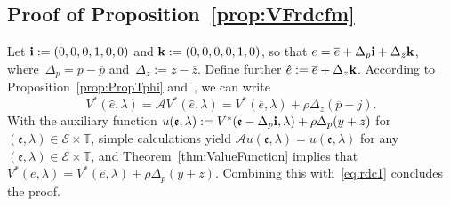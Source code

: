 \documentclass{amsart}[11pt]
\numberwithin{equation}{section}
\theoremstyle{definition}
\newcommand{\Ee}{\mathcal{E}}
\newcommand{\TT}{\mathbb{T}}
\newcommand{\ee}{\mathfrak{e}}
\newcommand{\Aa}{\mathcal{A}}
\begin{document}
\begin{appendix}
\section{Proof of Proposition~\ref{prop:VFrdcfm}}\label{app:VFrdcfm}
Let ${\bf i} := (0, 0, 0, 1, 0, 0)$ and ${\bf k} := (0, 0, 0, 0, 1, 0)$, so that
$e = \overline{e} + \Delta_p {\bf i} + \Delta_z {\bf k}$,
where~$\Delta_p = p- \overline{p}$ and~$\Delta_z := z - \overline{z}$.
Define further $\hat{e} := \overline{e} + \Delta_{z}{\bf k}$. 
According to Proposition~\ref{prop:PropTphi} and~\cite[Theorem 3]{denardo1967contraction}, 
we can write
\begin{equation}\label{eq:rdc1}
V^*(\hat{e}, \lambda) = \Aa V^*(\hat{e}, \lambda)
=
V^*(\overline{e}, \lambda) + \rho\Delta_z(\overline{p} - j).
\end{equation}
With the auxiliary function
$u(\ee, \mathfrak{\lambda}) := V^*(\ee - \Delta_p {\bf i}, \lambda) + \rho\Delta_p(y+z)$
for $(\ee, \lambda)\in \Ee\times \TT$, 
simple calculations yield $\Aa u(\ee, \lambda) = u(\ee, \lambda)$  for any~$(\ee, \lambda)\in \Ee\times \TT$,
and Theorem~\ref{thm:ValueFunction} implies that
$V^*(e, \lambda) = V^*(\hat{e}, \lambda) + \rho\Delta_p (y+z)$.
Combining this with~\eqref{eq:rdc1} concludes the proof.



\end{appendix}
\end{document}

